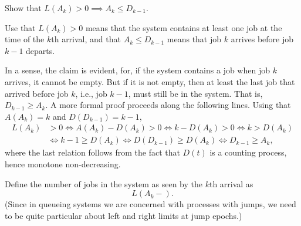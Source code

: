 \begin{extra} Show  that $L(A_k)>0 \implies A_k \leq D_{k-1}$.
  \begin{hint} Use that $L(A_k)>0$ means that the system contains at least one job at the time of the $k$th arrival, and that $A_k \leq D_{k-1}$ means that job $k$ arrives before job $k-1$ departs.
  \end{hint}
  \begin{solution} In a sense, the claim is evident, for, if the system contains a job when job $k$ arrives, it cannot be empty.
    But if it is not empty, then at least the last job that arrived before job $k$, i.e., job $k-1$, must still be in the system.
    That is, $D_{k-1} \geq A_k$.
    A more formal proof proceeds along the following lines.
    Using that $A(A_k) = k$ and $D(D_{k-1})= k-1$,
  \begin{equation*}
    \begin{split}
      L(A_k) &> 0 \Leftrightarrow A(A_k) - D(A_k) > 0   \Leftrightarrow k - D(A_k) > 0 \Leftrightarrow k > D(A_k) \\
      &\Leftrightarrow k-1 \geq D(A_k) \Leftrightarrow D(D_{k-1}) \geq D(A_k) \Leftrightarrow D_{k-1} \geq A_k, 
    \end{split}
  \end{equation*}
  where the last relation follows from the fact that $D(t)$ is a
  counting process, hence monotone non-decreasing.
\end{solution}
\end{extra}

Define the number of jobs in the system as seen by the $k$th arrival  as
\begin{equation}
  \label{eq:Lk}
  L(A_k-).
\end{equation}
(Since in queueing systems we are concerned with processes with jumps, we need to be quite particular about left and right limits at jump epochs.)


